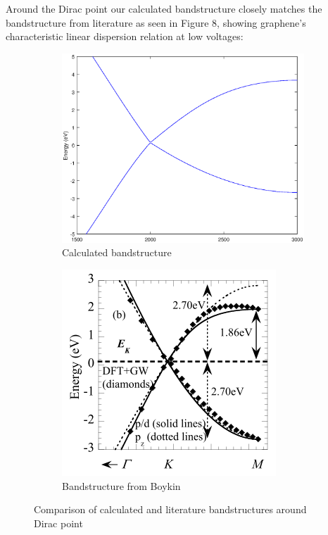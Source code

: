 \documentclass[11pt]{article}
\begin{document}
Around the Dirac point our calculated bandstructure closely matches the bandstructure from literature as seen in Figure 8, showing graphene's characteristic linear dispersion relation at low voltages:

\begin{figure}[h!]
\centering
\begin{subfigure}[b]{0.3\textwidth}
    \includegraphics[width=\textwidth]{DiracPoint.eps}
\caption{Calculated bandstructure}
\end{subfigure}
\begin{subfigure}[b]{0.3\textwidth}
    \includegraphics[width=\textwidth]{paper_diracpoint.png}
\caption{Bandstructure from Boykin}
\end{subfigure}
\caption{Comparison of calculated and literature bandstructures around Dirac point}
\end{figure}
\end{document}
